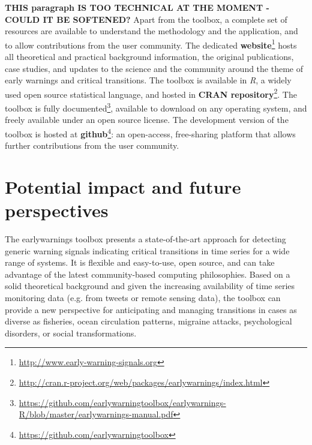 \documentclass[12pt,a4paper,final]{article}
\begin{document}
\label{sec:resources}
{\bf THIS paragraph IS TOO TECHNICAL AT THE MOMENT - COULD IT BE SOFTENED?}
Apart from the toolbox, a complete set of resources are available to understand the methodology and the application, and to allow contributions from the user community. The dedicated \textbf{website}\footnote{\url{http://www.early-warning-signals.org}} hosts all theoretical and practical background information, the original publications, case studies, and updates to the science and the community around the theme of early warnings and critical transitions. The toolbox is available in \textit{R}, a widely used open source statistical language, and hosted in \textbf{CRAN repository}\footnote{\url{http://cran.r-project.org/web/packages/earlywarnings/index.html}}. The toolbox is fully documented\footnote{\url{https://github.com/earlywarningtoolbox/earlywarnings-R/blob/master/earlywarnings-manual.pdf}}, available to download on any operating system, and freely available under an open source license. The development version of the toolbox is hosted at \textbf{github}\footnote{\url{https://github.com/earlywarningtoolbox}}: an open-access, free-sharing platform that allows further contributions from the user community.


\section{Potential impact and future perspectives}
The earlywarnings toolbox presents a state-of-the-art approach for detecting generic warning signals indicating critical transitions in time series for a wide range of systems. It is flexible and easy-to-use, open source, and can take advantage of the latest community-based computing philosophies. Based on a solid theoretical background and given the increasing availability of time series monitoring data (e.g. from tweets or remote sensing data), the toolbox can provide a new perspective for anticipating and managing transitions in cases as diverse as fisheries, ocean circulation patterns, migraine attacks, psychological disorders, or social transformations.
\end{document}
